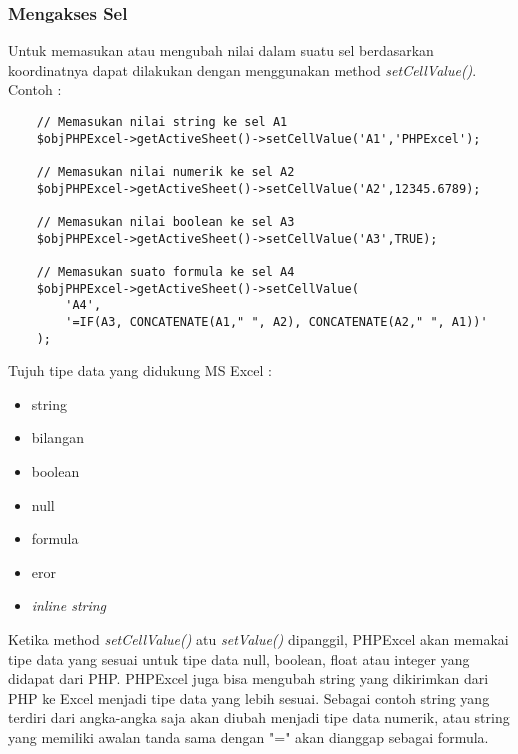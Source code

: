 \subsubsection{Mengakses Sel}
Untuk memasukan atau mengubah nilai dalam suatu sel berdasarkan koordinatnya dapat dilakukan dengan menggunakan method \textit{setCellValue()}.\cite{phpexcel:14} \\
Contoh :
\begin{lstlisting}
	// Memasukan nilai string ke sel A1
	$objPHPExcel->getActiveSheet()->setCellValue('A1','PHPExcel');

	// Memasukan nilai numerik ke sel A2
	$objPHPExcel->getActiveSheet()->setCellValue('A2',12345.6789);

	// Memasukan nilai boolean ke sel A3
	$objPHPExcel->getActiveSheet()->setCellValue('A3',TRUE);
	
	// Memasukan suato formula ke sel A4
	$objPHPExcel->getActiveSheet()->setCellValue(
	    'A4', 
	    '=IF(A3, CONCATENATE(A1," ", A2), CONCATENATE(A2," ", A1))'
	);
\end{lstlisting}
Tujuh tipe data yang didukung MS Excel :
\begin{itemize}
 	\item string
 	\item bilangan
 	\item boolean
 	\item null
 	\item formula
 	\item eror
 	\item \textit{inline string}
\end{itemize}
Ketika method \textit{setCellValue()} atu \textit{setValue()} dipanggil, PHPExcel akan memakai tipe data yang sesuai untuk tipe data null, boolean, float atau integer yang didapat dari PHP. PHPExcel juga bisa mengubah string yang dikirimkan dari PHP ke Excel menjadi tipe data yang lebih sesuai. Sebagai contoh string yang terdiri dari angka-angka saja akan diubah menjadi tipe data numerik, atau string yang memiliki awalan tanda sama dengan "=" akan dianggap sebagai formula.\cite{phpexcel:14} 

